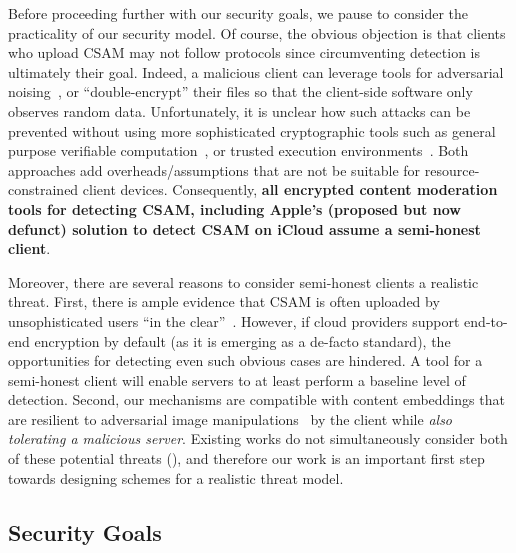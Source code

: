 %
Before proceeding further with our security goals, we pause to consider the practicality of our security model. Of course, the obvious objection is that clients who upload CSAM may not follow protocols since circumventing detection is ultimately their goal. Indeed, a malicious client can leverage tools for adversarial noising~\cite{shan2023glaze}, or ``double-encrypt'' their files so that the client-side software only observes random data. Unfortunately, it is unclear how such attacks can be prevented without using more sophisticated cryptographic tools such as general purpose verifiable computation~\cite{fiore2014efficiently}, or trusted execution environments~\cite{jauernig2020trusted}. Both approaches add overheads/assumptions that are not be suitable for resource-constrained client devices. Consequently, \textbf{all encrypted content moderation tools for detecting CSAM, including Apple's (proposed but now defunct) solution to detect CSAM on iCloud assume a semi-honest client}.



Moreover, there are several reasons to consider semi-honest clients a realistic threat. First, there is ample evidence that CSAM is often uploaded by unsophisticated users ``in the clear''~\cite{csam_example_1,csam_example_2}. However, if cloud providers support end-to-end encryption by default (as it is emerging as a de-facto standard), the opportunities for detecting even such obvious cases are hindered. A tool for a semi-honest client will enable servers to at least perform a baseline level of detection. Second, our mechanisms are compatible with content embeddings that are resilient to adversarial image manipulations~\cite{yang2025certphash} by the client while \emph{also tolerating a malicious server}. Existing works do not simultaneously consider both of these potential threats (), 
and therefore our work is an important first step towards designing schemes for a realistic threat model.





\subsection{Security Goals}
\label{sec:security}

